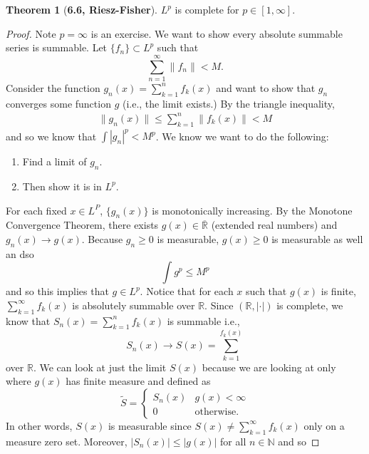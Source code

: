 \documentclass[12pt]{article}
\newcommand{\R}{\mathbb{R}}
\newcommand{\N}{\mathbb{N}}
\theoremstyle{definition}
\newtheorem*{thm}{Theorem}
\begin{document}
\begin{thm}[\textbf{6.6, Riesz-Fisher}]

    \( L^p \) is complete for \( p \in [1, \infty] \).

    \begin{proof}
        Note \( p = \infty \) is an exercise. We want to show every absolute summable series is summable.
        Let \( \{f_n\}  \subset L^p \) such that 
            \[
                \sum_{n=1}^{\infty} \lVert f_n \rVert < M.  
            \]
        Consider the function \( \displaystyle g_n(x) = \sum_{k=1}^{n} f_k(x) \) and want to show that \(g_n \) converges some function \( g \) (i.e., the limit exists.) By the triangle inequality,
            \begin{align*}
                \lVert g_n(x) \rVert \leq \sum_{k=1}^{n} \lVert f_k(x) \rVert < M
            \end{align*}
        and so we know that \( \displaystyle \int |g_n|^p < M^p \). We know we want to do the following:
        \begin{enumerate}
            \item Find a limit of \( g_n \).
            \item Then show it is in \( L^p \).
        \end{enumerate}
        For each fixed \( x \in L^P \), \( \{g_n(x) \} \) is monotonically increasing. By the Monotone Convergence Theorem, there exists \( g(x) \in \overline{\R} \) (extended real numbers) and \( g_n(x) \to g(x) \). Because \( g_n \geq 0 \) is measurable, \( g(x) \geq 0 \) is measurable as well an dso 
            \[
                \int g^p \leq M^p
            \]
        and so this implies that \( g \in L^p \). Notice that for each \( x \) such that \( g(x) \) is finite, \( \displaystyle \sum_{k=1}^{\infty} f_k(x) \) is absolutely summable over \( \R \). Since \( (\R, |\cdot|) \) is complete, we know that \( \displaystyle S_n(x) = \sum_{k=1}^{n} f_k(x) \) is summable i.e.,
            \[
                S_n(x) \to S(x) = \sum_{k=1}^{f_k(x)}  
            \]
        over \( \R \).  We can look at just the limit \( S(x) \) because we are looking at only where \( g(x)\) has finite measure and defined as
            \[
                \widetilde{S} =  \begin{cases}
                    S_n(x) & g(x) < \infty \\
                    0 & \text{otherwise}.
                \end{cases}  
            \]
        In other words, \( S(x) \) is measurable since \( \displaystyle S(x) \neq \sum_{k=1}^{\infty} f_k(x) \) only on a measure zero set. Moreover, \( |S_n(x)| \leq |g(x)| \) for all \( n \in \N \) and so 

\end{proof}
\end{thm}
\end{document}
